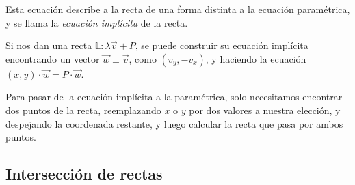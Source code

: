 \documentclass[../teoria.root.tex]{subfiles}
\begin{document}
Esta ecuación describe a la recta de una forma distinta a la ecuación
paramétrica, y se llama la \textit{ecuación implícita} de la recta.

Si nos dan una recta $\mathbb{L}:\lambda\vec{v}+P$, se puede construir su
ecuación implícita encontrando un vector $\vec{w}\perp\vec{v}$, como
$(v_y,-v_x)$, y haciendo la ecuación $(x,y)\cdot\vec{w}=P\cdot\vec{w}$.

Para pasar de la ecuación implícita a la paramétrica, solo necesitamos
encontrar dos puntos de la recta, reemplazando $x$ o $y$ por dos valores a
nuestra elección, y despejando la coordenada restante, y luego calcular la
recta que pasa por ambos puntos.

\subsection{Intersección de rectas}
\end{document}

